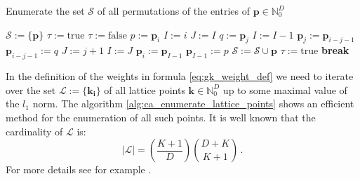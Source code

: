 \documentclass[a4paper,10pt]{article}
\begin{document}
\begin{algorithm}[h!]
  \caption{Enumerate the set $\mathcal{S}$ of all permutations
    of the entries of $\mathbf{p} \in \mathbb{N}_{0}^{D}$}
  \label{alg:ca_enumerate_permutations}
  \begin{algorithmic}
      \State $\mathcal{S} := \{\mathbf{p}\}$
      \State $\tau := \mathrm{true}$
        \State $\tau := \mathrm{false}$
          \State $p := \mathbf{p}_{i}$
            \State $I := i$
              \State $J := I$
                \State $q := \mathbf{p}_{j}$
                  \State $I := I - 1$
                \EndIf
                \State $\mathbf{p}_{j} := \mathbf{p}_{i-j-1}$
                \State $\mathbf{p}_{i-j-1} := q$
                  \State $J := j + 1$
                \EndIf
              \EndFor
                \State $I := J$
              \EndIf
            \EndIf
            \State $\mathbf{p}_{i} := \mathbf{p}_{I-1}$
            \State $\mathbf{p}_{I-1} := p$
            \State $\mathcal{S} := \mathcal{S} \cup \mathbf{p}$
            \State $\tau := \mathrm{true}$
            \State \bf{break}
          \EndIf
        \EndFor
      \EndWhile
    \EndProcedure
  \end{algorithmic}
\end{algorithm}

In the definition of the weights in formula \eqref{eq:gk_weight_def}
we need to iterate over the set $\mathcal{L} := \{\mathbf{k_{i}}\}$ of all
lattice points $\mathbf{k} \in \mathbb{N}_{0}^{D}$ up to some maximal value of
the $l_{1}$ norm. The algorithm \eqref{alg:ca_enumerate_lattice_points}
shows an efficient method for the enumeration of all such points. It
is well known that the cardinality of $\mathcal{L}$ is:
\begin{equation}
  |\mathcal{L}| = \left(\frac{K+1}{D}\right) \binom{D+K}{K+1} \,.
\end{equation}
For more details see for example \cite{serra-sagrista}.
\end{document}
